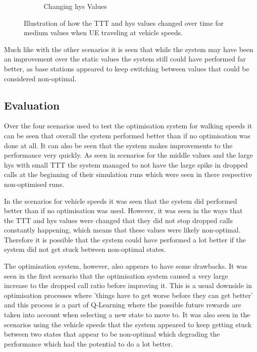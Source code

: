 \begin{figure}[H]
\begin{subfigure}[b]{0.49\textwidth}
                \caption{Changing hys Values}
                \label{fig:veh_highhys_hys}
        \end{subfigure}
        \caption{Illustration of how the TTT and hys values changed over time for medium values when UE traveling at vehicle speeds.}\label{fig:veh_highhys_ttthys}
\end{figure}
Much like with the other scenarios it is seen that while the system may have been an improvement over the static values the system still could have performed far better, as base stations appeared to keep switching between values that could be considered non-optimal.
\subsection{Evaluation}
Over the four scenarios used to test the optimisation system for walking speeds it can be seen that overall the system performed better than if no optimisation was done at all. It can also be seen that the system makes improvements to the performance very quickly. As seen in scenarios for the middle values and the large hys with small TTT the system managed to not have the large spike in dropped calls at the beginning of their simulation runs which were seen in there respective non-optimised runs.

In the scenarios for vehicle speeds it was seen that the system did performed better than if no optimisation was used. However, it was seen in the ways that the TTT and hys values were changed that they did not stop dropped calls constantly happening, which means that these values were likely non-optimal. Therefore it is possible that the system could have performed a lot better if the system did not get stuck between non-optimal states.

The optimisation system, however, also appears to have some drawbacks. It was seen in the first scenario that the optimisation system caused a very large increase to the dropped call ratio before improving it. This is a usual downside in optimisation processes where 'things have to get worse before they can get better' and this process is a part of Q-Learning where the possible future rewards are taken into account when selecting a new state to move to. It was also seen in the scenarios using the vehicle speeds that the system appeared to keep getting stuck between two states that appear to be non-optimal which degrading the performance which had the potential to do a lot better.